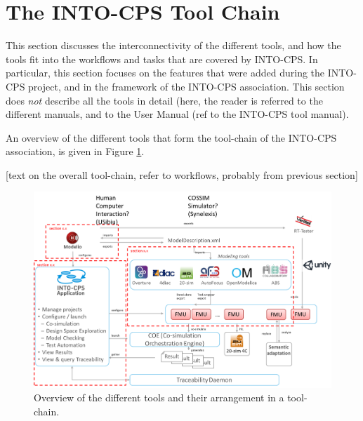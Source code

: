 
\section{The INTO-CPS Tool Chain}\label{sec:toolchain}




This section discusses the interconnectivity of the different tools, and how the tools fit into the workflows and tasks that are covered by INTO-CPS. In particular, this section focuses on the features that were added during the INTO-CPS project, and in the framework of the INTO-CPS association. This section does \textit{not} describe all the tools in detail (here, the reader is referred to the different manuals, and to the User Manual (ref to the INTO-CPS tool manual).

An overview of the different tools that form the tool-chain of the INTO-CPS association, is given in Figure \ref{fig:tool-chain}.

[text on the overall tool-chain, refer to workflows, probably from previous section]

\begin{figure}[!ht]
	\centering
		\includegraphics[width=0.9 \textwidth]{./figures/toolchain_association}
	\caption{Overview of the different tools and their arrangement in a tool-chain.}
	\label{fig:tool-chain}
\end{figure}

